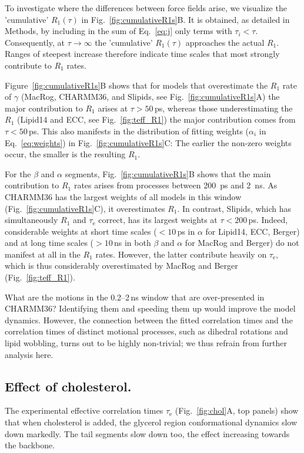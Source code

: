 \documentclass[journal=jpcbfk,manuscript=article,layout=twocolumn]{achemso}
\begin{document}
To investigate where the differences between force fields arise, we visualize the 
'cumulative' $R_1(\tau)$ in Fig.~\ref{fig:cumulativeR1s}B.
It is obtained, as detailed in Methods,
by including in the sum of Eq.~\eqref{eq:j} only terms with $\tau_i<\tau$.
Consequently, at $\tau\to\infty$ the 'cumulative' $R_1(\tau)$ approaches the actual $R_1$. Ranges of steepest increase therefore indicate time scales that most strongly contribute to $R_1$ rates.

Figure~\ref{fig:cumulativeR1s}B shows
that for models that overestimate the $R_1$ rate of $\gamma$
(MacRog, CHARMM36, and Slipids, see Fig.~\ref{fig:cumulativeR1s}A)
the major contribution to $R_1$ arises at $\tau>50$\,ps, whereas those underestimating the $R_1$ 
(Lipid14 and ECC, see Fig.~\ref{fig:teff_R1})
the major contribution comes from $\tau<50$\,ps. 
%
This also manifests in the
distribution of fitting weights ($\alpha_i$ in Eq.~\eqref{eq:weights}) in Fig.~\ref{fig:cumulativeR1s}C:
The earlier the non-zero weights occur, the smaller is the resulting $R_1$.


For the $\beta$ and $\alpha$ segments, Fig.~\ref{fig:cumulativeR1s}B shows
that the main contribution to $R_1$ rates arises from processes
between 200~ps and 2~ns.
%
As CHARMM36 has the largest weights of all models in this window (Fig.~\ref{fig:cumulativeR1s}C),
it overestimates $R_1$.
%
In contrast, Slipids, which has simultaneously $R_1$ and $\tau_\mathrm e$ correct,
has its largest weights at $\tau<200$\,ps.
%
Indeed, considerable weights
at short time scales ($<10$\,ps in $\alpha$ for Lipid14, ECC, Berger) and
at long time scales ($>10$\,ns in both $\beta$ and $\alpha$ for MacRog and Berger)
do not manifest at all in the $R_1$ rates.
%
However, the latter contribute heavily on $\tau_\mathrm e$,
which is thus considerably overestimated by MacRog and Berger (Fig.~\ref{fig:teff_R1}).

What are the motions in the 0.2--2\,ns window that are over-presented in CHARMM36?
Identifying them and speeding them up would improve the model dynamics.
However, the connection between the fitted correlation times and the correlation times of distinct motional processes, such as dihedral rotations and lipid wobbling, turns out to be highly non-trivial; we thus refrain from further analysis here.

\subsection*{Effect of cholesterol.}
The experimental effective correlation times $\tau_\mathrm e$
(Fig.~\ref{fig:chol}A, top panels)
show that when cholesterol is added,
the glycerol region conformational dynamics
slow down markedly.
%
The tail segments slow down too,
the effect increasing towards the backbone.
\end{document}
